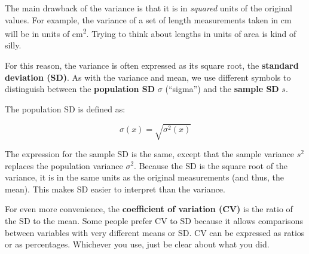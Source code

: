 \documentclass[
  13,
  letterpaper,
]{report}
\begin{document}
The main drawback of the variance is that it is in \emph{squared} units
of the original values. For example, the variance of a set of length
measurements taken in cm will be in units of cm\textsuperscript{2}.
Trying to think about lengths in units of area is kind of silly.

For this reason, the variance is often expressed as its square root, the
\textbf{standard deviation (SD)}. As with the variance and mean, we use
different symbols to distinguish between the \textbf{population SD}
\(\sigma\) (``sigma'') and the \textbf{sample SD} \(s\).

The population SD is defined as:

\[\sigma\left(x\right)=\sqrt{\sigma^2\left(x\right)}\]

The expression for the sample SD is the same, except that the sample
variance \(s^2\) replaces the population variance \(\sigma^2\). Because
the SD is the square root of the variance, it is in the same units as
the original measurements (and thus, the mean). This makes SD easier to
interpret than the variance.

For even more convenience, the \textbf{coefficient of variation (CV)} is
the ratio of the SD to the mean. Some people prefer CV to SD because it
allows comparisons between variables with very different means or SD. CV
can be expressed as ratios or as percentages. Whichever you use, just be
clear about what you did.
\end{document}
